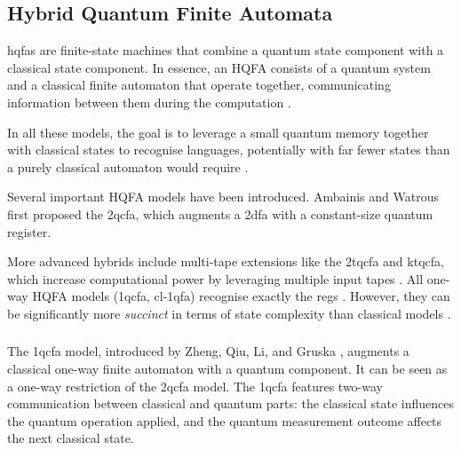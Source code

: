 \subsection{Hybrid Quantum Finite Automata}
\label{sec:hybrid-qfa}

\glspl{hqfa} are finite-state machines that combine a quantum state component with a classical state component. In essence, an HQFA consists of a quantum system and a classical finite automaton that operate together, communicating information between them during the computation \cite{li2015hybrid}.

In all these models, the goal is to leverage a small quantum memory together with classical states to recognise languages, potentially with far fewer states than a purely classical automaton would require \cite{zheng2012one}.

Several important HQFA models have been introduced. Ambainis and Watrous \cite{ambainis2002two} first proposed the \gls{2qcfa}, which augments a \gls{2dfa} with a constant-size quantum register. 

More advanced hybrids include multi-tape extensions like the \gls{2tqcfa} and \gls{ktqcfa}, which increase computational power by leveraging multiple input tapes \cite{zheng2011two}. All one-way HQFA models (\gls{1qcfa}, \gls{cl-1qfa}) recognise exactly the \glspl{reg} \cite{li2015hybrid, zheng2012one}. However, they can be significantly more \textit{succinct} in terms of state complexity than classical models \cite{xiao2021state}.

\subsubsection{}

The \gls{1qcfa} model, introduced by Zheng, Qiu, Li, and Gruska \cite{zheng2012one}, augments a classical one-way finite automaton with a quantum component. It can be seen as a one-way restriction of the \gls{2qcfa} model. The \gls{1qcfa} features two-way communication between classical and quantum parts: the classical state influences the quantum operation applied, and the quantum measurement outcome affects the next classical state.

